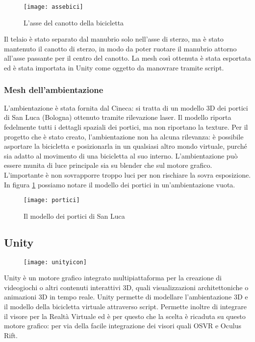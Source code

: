 \begin{wrapfigure}{r}{0.35\textwidth} %
    \centering
    \vspace{-1.3cm}
    \texttt{[image: assebici]}
    \caption{L'asse del canotto della bicicletta}
    \vspace{-1.3cm}
\end{wrapfigure}
\noindent Il telaio è stato separato dal manubrio solo nell'asse di sterzo, ma è stato mantenuto il canotto di sterzo, in modo da poter ruotare il manubrio attorno all'asse passante per il centro del canotto. La mesh così ottenuta è stata esportata ed è stata importata in Unity come oggetto da manovrare tramite script.\\
\subsubsection{Mesh dell'ambientazione}
L'ambientazione è stata fornita dal Cineca: si tratta di un modello 3D dei portici di San Luca (Bologna) ottenuto tramite rilevazione laser. Il modello riporta fedelmente tutti i dettagli spaziali dei portici, ma non riportano la texture. Per il progetto che è stato creato, l'ambientazione non ha alcuna rilevanza: è possibile asportare la bicicletta e posizionarla in un qualsiasi altro mondo virtuale, purché sia adatto al movimento di una bicicletta al suo interno. L'ambientazione può essere munita di luce principale sia su blender che sul motore grafico. L'importante è non sovrapporre troppo luci per non rischiare la sovra esposizione. In figura \ref{fig:portici} possiamo notare il modello dei portici in un'ambientazione vuota.
	\newpage
\begin{figure}[htb]
    \centering
    \vspace{-0.7cm}
    \texttt{[image: portici]}
    \caption{Il modello dei portici di San Luca\label{fig:portici}}
    \vspace{-0.3cm}
\end{figure}

\subsection{Unity}
\noindent 
\begin{wrapfigure}{r}{0.2\textwidth} %
    \centering
    \vspace{-1.3cm}
    \texttt{[image: unityicon]}
    \vspace{-1.3cm}
\end{wrapfigure}
Unity è un motore grafico integrato multipiattaforma per la creazione di videogiochi o altri contenuti interattivi 3D, quali visualizzazioni architettoniche o animazioni 3D in tempo reale. Unity permette di modellare l'ambientazione 3D e il modello della bicicletta virtuale attraverso script. Permette inoltre di integrare il visore per la Realtà Virtuale ed è per questo che la scelta è ricaduta su questo motore grafico: per via della facile integrazione dei visori quali OSVR e Oculus Rift. 

